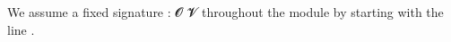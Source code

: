We assume a fixed signature  \as :  \ab 𝓞 \ab 𝓥 throughout the module by starting with the line
\AgdaSpace{}%
\AgdaSpace{}%
\AgdaSymbol{\{}\AgdaSpace{}%
\AgdaSymbol{:}\AgdaSpace{}%
\AgdaSpace{}%
\AgdaSpace{}%
\AgdaSymbol{\}}\AgdaSpace{}%
.%

